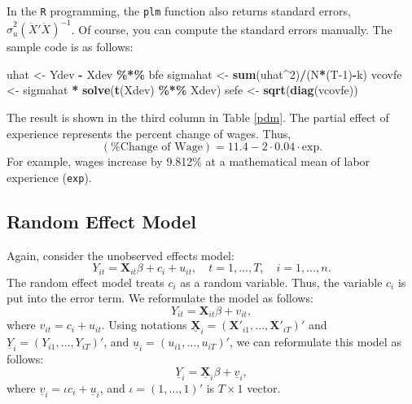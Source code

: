 \documentclass[
  12pt,
]{article}
\newenvironment{Shaded}{\begin{snugshade}}{\end{snugshade}}
\newcommand{\DecValTok}[1]{\textcolor[rgb]{0.00,0.00,0.81}{#1}}
\newcommand{\KeywordTok}[1]{\textcolor[rgb]{0.13,0.29,0.53}{\textbf{#1}}}
\newcommand{\NormalTok}[1]{#1}
\newcommand{\OperatorTok}[1]{\textcolor[rgb]{0.81,0.36,0.00}{\textbf{#1}}}
\newcommand{\StringTok}[1]{\textcolor[rgb]{0.31,0.60,0.02}{#1}}
\begin{document}
In the \texttt{R} programming,
the \texttt{plm} function also returns standard errors, \(\hat{\sigma}_u^2 (\ddot{X}' \ddot{X})^{-1}\).
Of course, you can compute the standard errors manually.
The sample code is as follows:

\begin{Shaded}
\begin{Highlighting}[]
\NormalTok{uhat \textless{}{-}}\StringTok{ }\NormalTok{Ydev }\OperatorTok{{-}}\StringTok{ }\NormalTok{Xdev }\OperatorTok{\%*\%}\StringTok{ }\NormalTok{bfe}
\NormalTok{sigmahat \textless{}{-}}\StringTok{ }\KeywordTok{sum}\NormalTok{(uhat}\OperatorTok{\^{}}\DecValTok{2}\NormalTok{)}\OperatorTok{/}\NormalTok{(N}\OperatorTok{*}\NormalTok{(T}\DecValTok{{-}1}\NormalTok{)}\OperatorTok{{-}}\NormalTok{k)}
\NormalTok{vcovfe \textless{}{-}}\StringTok{ }\NormalTok{sigmahat }\OperatorTok{*}\StringTok{ }\KeywordTok{solve}\NormalTok{(}\KeywordTok{t}\NormalTok{(Xdev) }\OperatorTok{\%*\%}\StringTok{ }\NormalTok{Xdev)}
\NormalTok{sefe \textless{}{-}}\StringTok{ }\KeywordTok{sqrt}\NormalTok{(}\KeywordTok{diag}\NormalTok{(vcovfe))}
\end{Highlighting}
\end{Shaded}

The result is shown in the third column in Table \ref{pdm}.
The partial effect of experience represents the percent change of wages.
Thus,
\[
  (\text{\% Change of Wage}) = 11.4 - 2 \cdot 0.04 \cdot \text{exp}.
\]
For example, wages increase by 9.812\% at a mathematical mean of labor experience (\texttt{exp}).

\hypertarget{random-effect-model}{%
\subsection{Random Effect Model}\label{random-effect-model}}

Again, consider the unobserved effects model:
\[
  Y_{it} = \mathbf{X}_{it} \beta + c_i + u_{it}, \quad t = 1, \ldots, T, \quad i = 1, \ldots, n.
\]
The random effect model treats \(c_i\) as a random variable.
Thus, the variable \(c_i\) is put into the error term.
We reformulate the model as follows:
\[
  Y_{it} = \mathbf{X}_{it} \beta + v_{it},
\]
where \(v_{it} = c_i + u_{it}\).
Using notations \(\underline{\mathbf{X}}_i = (\mathbf{X}'_{i1}, \ldots, \mathbf{X}'_{iT})'\)
and \(\underline{Y}_i = (Y_{i1}, \ldots, Y_{iT})'\), and \(\underline{u}_i = (u_{i1}, \ldots, u_{iT})'\),
we can reformulate this model as follows:
\[
  \underline{Y}_i = \underline{\mathbf{X}}_i \beta + \underline{v}_i,
\]
where \(\underline{v}_i = \iota c_i + \underline{u}_i\), and
\(\iota = (1, \ldots, 1)'\) is \(T \times 1\) vector.
\end{document}
